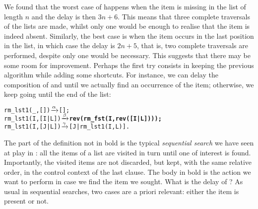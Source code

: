 We found that the worst case of  happens when the
item is missing in the list of length \(n\) and the delay is then
\(3n+6\). This means that three complete traversals of the lists are
made, whilst only one would be enough to realise that the item is
indeed absent. Similarly, the best case is when the item occurs in the
last position in the list, in which case the delay is \(2n+5\), that
is, two complete traversals are performed, despite only one would be
necessary. This suggests that there may be some room for
improvement. Perhaps the first try consists in keeping the previous
algorithm while adding some shortcuts. For instance, we can delay the
composition of  and  until we
actually find an occurrence of the item; otherwise, we keep going
until the end of the list:
\begin{alltt}
rm_lst1(_,   []) \(\smashedrightarrow{\alpha}\) [];
rm_lst1(I,[I|L]) \(\smashedrightarrow{\beta}\) \textbf{rev(rm_fst(I,rev([I|L])));}
rm_lst1(I,[J|L]) \(\smashedrightarrow{\gamma}\) [J|rm_lst1(I,L)].
\end{alltt}
The part of the definition not in bold is the typical \emph{sequential
  search} we have seen at play in : all the items
of a list are visited in turn until one of interest is
found. Importantly, the visited items are not discarded, but kept,
with the same relative order, in the control context of the last
clause. The body in bold is the action we want to perform in case we
find the item we sought. What is the delay of ? As
usual in sequential searches, two cases are a priori relevant: either
the item is present or not.

